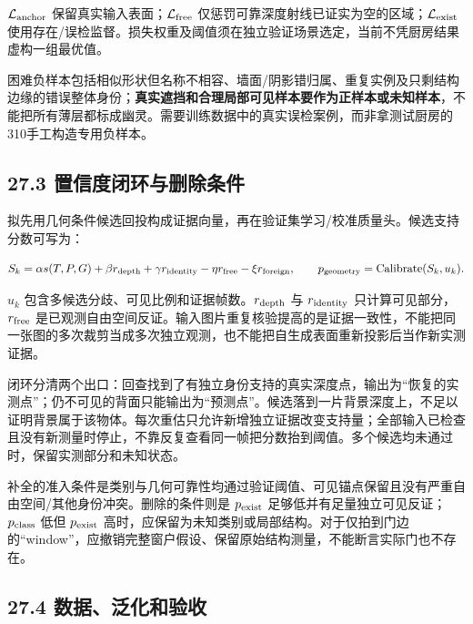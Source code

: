 \documentclass[UTF8,fontset=fandol]{ctexart}
\begin{document}
$\mathcal L_{\rm anchor}$ 保留真实输入表面；$\mathcal L_{\rm free}$ 仅惩罚可靠深度射线已证实为空的区域；$\mathcal L_{\rm exist}$ 使用存在/误检监督。损失权重及阈值须在独立验证场景选定，当前不凭厨房结果虚构一组最优值。



困难负样本包括相似形状但名称不相容、墙面/阴影错归属、重复实例及只剩结构边缘的错误整体身份；\textbf{真实遮挡和合理局部可见样本要作为正样本或未知样本}，不能把所有薄层都标成幽灵。需要训练数据中的真实误检案例，而非拿测试厨房的310手工构造专用负样本。



\subsection*{27.3 置信度闭环与删除条件}

拟先用几何条件候选回投构成证据向量，再在验证集学习/校准质量头。候选支持分数可写为：



\[
S_k=\alpha s(T,P,G)+\beta r_{\rm depth}+\gamma r_{\rm identity}
-\eta r_{\rm free}-\xi r_{\rm foreign},
\qquad p_{\rm geometry}={\rm Calibrate}(S_k,u_k).
\]

$u_k$ 包含多候选分歧、可见比例和证据帧数。$r_{\rm depth}$ 与 $r_{\rm identity}$ 只计算可见部分，$r_{\rm free}$ 是已观测自由空间反证。输入图片重复核验提高的是证据一致性，不能把同一张图的多次裁剪当成多次独立观测，也不能把自生成表面重新投影后当作新实测证据。



闭环分清两个出口：回查找到了有独立身份支持的真实深度点，输出为“恢复的实测点”；仍不可见的背面只能输出为“预测点”。候选落到一片背景深度上，不足以证明背景属于该物体。每次重估只允许新增独立证据改变支持量；全部输入已检查且没有新测量时停止，不靠反复查看同一帧把分数抬到阈值。多个候选均未通过时，保留实测部分和未知状态。



补全的准入条件是类别与几何可靠性均通过验证阈值、可见锚点保留且没有严重自由空间/其他身份冲突。删除的条件则是 $p_{\rm exist}$ 足够低并有足量独立可见反证；$p_{\rm class}$ 低但 $p_{\rm exist}$ 高时，应保留为未知类别或局部结构。对于仅拍到门边的“window”，应撤销完整窗户假设、保留原始结构测量，不能断言实际门也不存在。



\subsection*{27.4 数据、泛化和验收}
\end{document}
